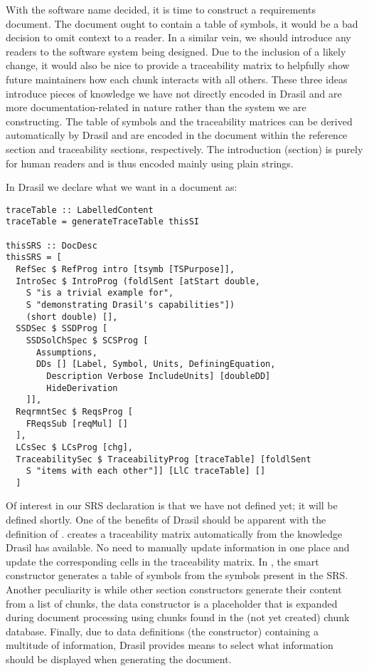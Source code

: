 With the software name decided, it is time to construct a requirements document. The document ought to contain a table of symbols, it would be a bad decision to omit context to a reader. In a similar vein, we should introduce any readers to the software system being designed. Due to the inclusion of a likely change, it would also be nice to provide a traceability matrix to helpfully show future maintainers how each chunk interacts with all others. These three ideas introduce pieces of knowledge we have not directly encoded in Drasil and are more documentation-related in nature rather than the system we are constructing. The table of symbols and the traceability matrices can be derived automatically by Drasil and are encoded in the document within the reference section and traceability sections, respectively. The introduction (section) is purely for human readers and is thus encoded mainly using plain strings.

In Drasil we declare what we want in a document as:

\begin{tcolorbox}[breakable, toprule at break=0pt, bottomrule at break=0pt]
\begin{verbatim}
traceTable :: LabelledContent
traceTable = generateTraceTable thisSI

thisSRS :: DocDesc
thisSRS = [
  RefSec $ RefProg intro [tsymb [TSPurpose]],
  IntroSec $ IntroProg (foldlSent [atStart double,
    S "is a trivial example for",
    S "demonstrating Drasil's capabilities"])
    (short double) [],
  SSDSec $ SSDProg [
    SSDSolChSpec $ SCSProg [
      Assumptions,
      DDs [] [Label, Symbol, Units, DefiningEquation,
        Description Verbose IncludeUnits] [doubleDD]
        HideDerivation
    ]],
  ReqrmntSec $ ReqsProg [
    FReqsSub [reqMul] []
  ],
  LCsSec $ LCsProg [chg],
  TraceabilitySec $ TraceabilityProg [traceTable] [foldlSent
    S "items with each other"]] [LlC traceTable] []
  ]
\end{verbatim}
\end{tcolorbox}

Of interest in our SRS declaration is that we have not defined  yet; it will be defined shortly. One of the benefits of Drasil should be apparent with the definition of .  creates a traceability matrix automatically from the knowledge Drasil has available. No need to manually update information in one place and update the corresponding cells in the traceability matrix. In , the  smart constructor generates a table of symbols from the symbols present in the SRS. Another peculiarity is while other section constructors generate their content from a list of chunks, the  data constructor is a placeholder that is expanded during document processing using chunks found in the (not yet created) chunk database. Finally, due to data definitions (the  constructor) containing a multitude of information, Drasil provides means to select what information should be displayed when generating the document.

